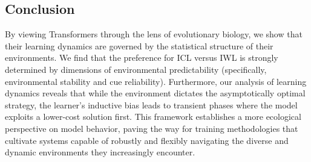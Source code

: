 \subsection{Conclusion}

By viewing Transformers through the lens of evolutionary biology, we show that their learning dynamics are governed by the statistical structure of their environments. We find that the preference for ICL versus IWL is strongly determined by dimensions of environmental predictability (specifically, environmental stability and cue reliability). Furthermore, our analysis of learning dynamics reveals that while the environment dictates the asymptotically optimal strategy, the learner's inductive bias leads to transient phases where the model exploits a lower-cost solution first. This framework establishes a more ecological perspective on model behavior, paving the way for training methodologies that cultivate systems capable of robustly and flexibly navigating the diverse and dynamic environments they increasingly encounter.





